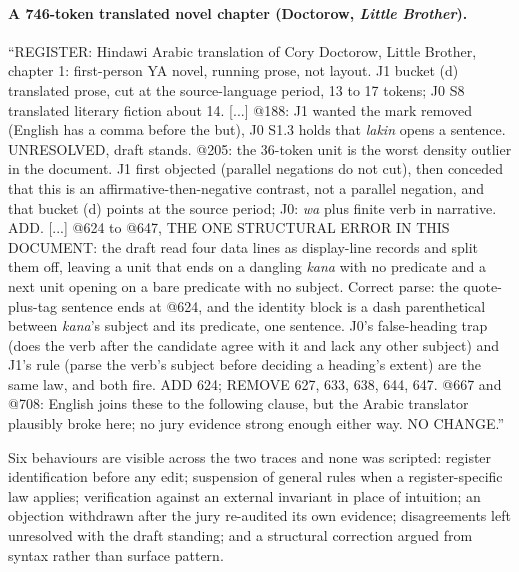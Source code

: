 \documentclass[11pt]{article}
\begin{document}
\paragraph{A 746-token translated novel chapter (Doctorow, \textit{Little Brother}).}
\begin{tcolorbox}[colback=white, boxrule=0.4pt, left=3pt, right=3pt, top=3pt, bottom=3pt]
\scriptsize
``REGISTER: Hindawi Arabic translation of Cory Doctorow, Little Brother, chapter 1:
first-person YA novel, running prose, not layout. J1 bucket (d) translated prose, cut at
the source-language period, 13 to 17 tokens; J0 S8 translated literary fiction about 14.
[...] @188: J1 wanted the mark removed (English has a comma before the but), J0 S1.3
holds that \textit{lakin} opens a sentence. UNRESOLVED, draft stands. @205: the 36-token
unit is the worst density outlier in the document. J1 first objected (parallel negations
do not cut), then conceded that this is an affirmative-then-negative contrast, not a
parallel negation, and that bucket (d) points at the source period; J0: \textit{wa} plus
finite verb in narrative. ADD. [...] @624 to @647, THE ONE STRUCTURAL ERROR IN THIS
DOCUMENT: the draft read four data lines as display-line records and split them off,
leaving a unit that ends on a dangling \textit{kana} with no predicate and a next unit
opening on a bare predicate with no subject. Correct parse: the quote-plus-tag sentence
ends at @624, and the identity block is a dash parenthetical between \textit{kana}'s
subject and its predicate, one sentence. J0's false-heading trap (does the verb after the
candidate agree with it and lack any other subject) and J1's rule (parse the verb's
subject before deciding a heading's extent) are the same law, and both fire. ADD 624;
REMOVE 627, 633, 638, 644, 647. @667 and @708: English joins these to the following
clause, but the Arabic translator plausibly broke here; no jury evidence strong enough
either way. NO CHANGE.''
\end{tcolorbox}

Six behaviours are visible across the two traces and none was scripted: register
identification before any edit; suspension of general rules when a register-specific law
applies; verification against an external invariant in place of intuition; an objection
withdrawn after the jury re-audited its own evidence; disagreements left unresolved with
the draft standing; and a structural correction argued from syntax rather than surface
pattern.
\end{document}
